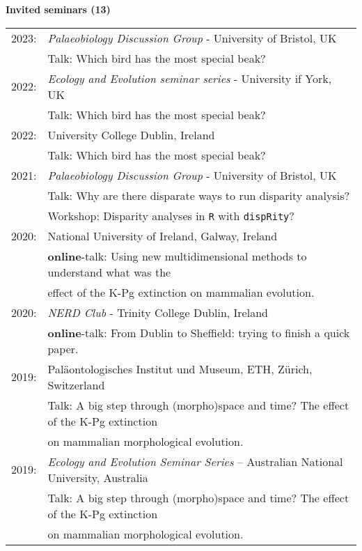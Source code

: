 \documentclass[10pt,a4paper]{article}
\begin{document}
{\raggedright\textbf{Invited seminars (13)}\\[1.5ex]
\begin{tabular}{ll}
2023: & \textit{Palaeobiology Discussion Group} - University of Bristol, UK\\
      & Talk: Which bird has the most special beak?\\
2022: & \textit{Ecology and Evolution seminar series} - University if York, UK\\
      & Talk: Which bird has the most special beak?\\
2022: & University College Dublin, Ireland\\
      & Talk: Which bird has the most special beak?\\
2021: & \textit{Palaeobiology Discussion Group} - University of Bristol, UK\\
      & Talk: Why are there disparate ways to run disparity analysis?\\
      & Workshop: Disparity analyses in \texttt{R} with \texttt{dispRity}?\\ 
2020: & National University of Ireland, Galway, Ireland\\
      & \textbf{online}-talk: Using new multidimensional methods to understand what was the\\
      & effect of the K-Pg extinction on mammalian evolution.\\
2020: & \textit{NERD Club} - Trinity College Dublin, Ireland\\
      & \textbf{online}-talk: From Dublin to Sheffield: trying to finish a quick paper.\\
2019: & Pal\"{a}ontologisches Institut und Museum, ETH, Z\"{u}rich, Switzerland\\
      & Talk: A big step through (morpho)space and time? The effect of the K-Pg extinction\\
      & on mammalian morphological evolution.\\
2019: & \textit{Ecology and Evolution Seminar Series} – Australian National University, Australia\\
      & Talk: A big step through (morpho)space and time? The effect of the K-Pg extinction\\
      & on mammalian morphological evolution.\\

\end{tabular}}
\end{document}
